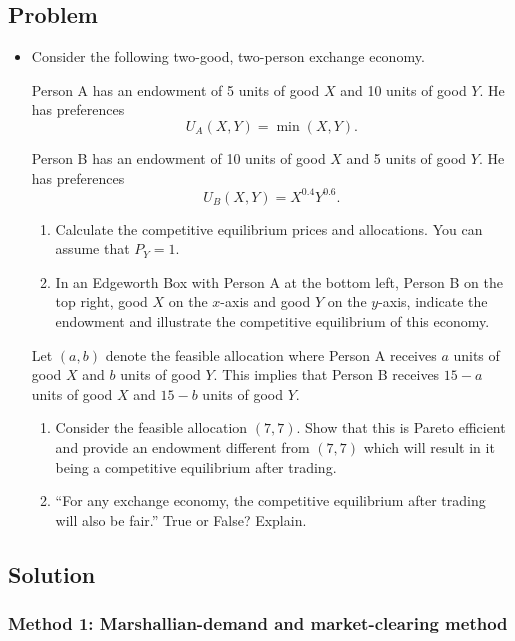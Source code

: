 \documentclass[12pt]{article}
\begin{document}
\subsection{Problem}
\begin{itemize}
    \item Consider the following two-good, two-person exchange economy.

    Person A has an endowment of 5 units of good \(X\) and 10 units of good \(Y\). He has preferences
    \[
    U_A(X,Y)=\min(X,Y).
    \]

    Person B has an endowment of 10 units of good \(X\) and 5 units of good \(Y\). He has preferences
    \[
    U_B(X,Y)=X^{0.4}Y^{0.6}.
    \]

    \begin{enumerate}[label=(\alph*)]
        \item Calculate the competitive equilibrium prices and allocations. You can assume that \(P_Y=1\).
        \item In an Edgeworth Box with Person A at the bottom left, Person B on the top right, good \(X\) on the \(x\)-axis and good \(Y\) on the \(y\)-axis, indicate the endowment and illustrate the competitive equilibrium of this economy.
    \end{enumerate}

    Let \((a,b)\) denote the feasible allocation where Person A receives \(a\) units of good \(X\) and \(b\) units of good \(Y\). This implies that Person B receives \(15-a\) units of good \(X\) and \(15-b\) units of good \(Y\).

    \begin{enumerate}[label=(\alph*),resume]
        \item Consider the feasible allocation \((7,7)\). Show that this is Pareto efficient and provide an endowment different from \((7,7)\) which will result in it being a competitive equilibrium after trading.
        \item ``For any exchange economy, the competitive equilibrium after trading will also be fair.'' True or False? Explain.
    \end{enumerate}
\end{itemize}

\newpage
\subsection{Solution}

\subsubsection{Method 1: Marshallian-demand and market-clearing method}
\end{document}
